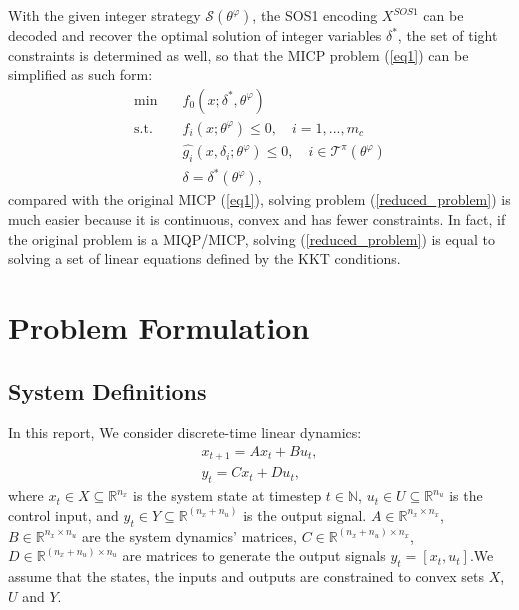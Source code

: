 \documentclass[a4paper]{report}
\begin{document}
With the given integer strategy $\mathcal{S}(\theta^\varphi)$, the SOS1 encoding $X^{SOS1}$ can be decoded and recover the optimal solution of integer variables $\delta^*$, the set of tight constraints is determined as well, so that the MICP problem (\ref*{eq1}) can be simplified as such form:
\begin{equation}
    \label{reduced_problem}%
    \begin{aligned}
        \min \quad       & f_0(x;\delta^*,\theta^\varphi )        \\
        \text{s.t.}\quad &
        f_i(x;\theta^\varphi) \leq 0, \quad i=1,...,m_c     \\                                         &
        \hat{g_i}(x,\delta_i;\theta^\varphi) \leq 0, \quad i \in \mathcal{T}^\pi(\theta^\varphi)
        \\
                         & \delta = \delta^*(\theta^\varphi),
    \end{aligned}
\end{equation}
compared with the original MICP (\ref{eq1}), solving problem (\ref{reduced_problem}) is much easier because it is continuous, convex and has fewer constraints. In fact, if the original problem is a MIQP/MICP, solving (\ref{reduced_problem}) is equal to solving a set of linear equations defined by the KKT conditions.


\chapter{Problem Formulation}
\section{System Definitions}
In this report, We consider discrete-time linear dynamics:
\begin{equation}
    \begin{aligned}
    \label{system dynamics}
    x_{t+1} = Ax_t+Bu_t,\\
    y_t = Cx_t + Du_t,
    \end{aligned}
\end{equation}
where $x_t \in X \subseteq  \mathbb{R}^{n_x}$ is the system state at timestep $t \in \mathbb{N}$, $u_t \in U \subseteq  \mathbb{R}^{n_u}$ is the control input, and $y_t \in Y \subseteq \mathbb{R}^{(n_x+n_u)}$ is the output signal. $A \in \mathbb{R}^{n_x \times n_x}$, $B \in \mathbb{R}^{n_x \times n_u}$ are the system dynamics' matrices, $C \in \mathbb{R}^{(n_x+n_u) \times n_x}$, $D \in \mathbb{R}^{(n_x+n_u) \times n_u}$ are matrices to generate the output signals $y_t = [x_t,u_t]$.We assume that the states, the inputs and outputs are constrained to convex sets $X$, $U$ and $Y$. 
\end{document}
